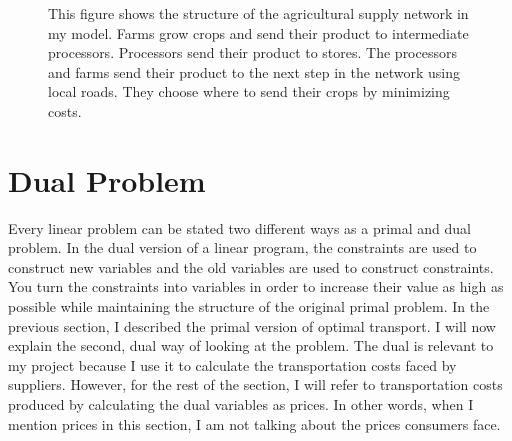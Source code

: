 \documentclass{report}
\begin{document}
\begin{figure}
\centering
\begin{framed}
\caption{This figure shows the structure of the agricultural supply network in my model. Farms grow crops and send their product to intermediate processors. Processors send their product to stores. The processors and farms send their product to the next step in the network using local roads. They choose where to send their crops by minimizing costs.}
\label{fig:spec}
\end{framed}
\end{figure}

\section{Dual Problem}

Every linear problem can be stated two different ways as a primal and dual problem. In the dual version of a linear program, the constraints are used to construct new variables and the old variables are used to construct constraints. You turn the constraints into variables in order to increase their value as high as possible while maintaining the structure of the original primal problem. In the previous section, I described the primal version of optimal transport. I will now explain the second, dual way of looking at the problem. The dual is relevant to my project because I use it to calculate the transportation costs faced by suppliers. However, for the rest of the section, I will refer to transportation costs produced by calculating the dual variables as prices. In other words, when I mention prices in this section, I am not talking about the prices consumers face. 
\end{document}
